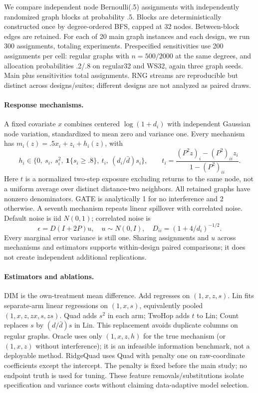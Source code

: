 \documentclass{article}
\newcommand{\one}{\mathbf 1}
\begin{document}
We compare independent node Bernoulli(.5) assignments with independently randomized graph blocks at probability .5. Blocks are deterministically constructed once by degree-ordered BFS, capped at 32 nodes. Between-block edges are retained. For each of 20 main graph instances and each design, we run 300 assignments, totaling \MainAssignments{} experiments. Prespecified sensitivities use 200 assignments per cell: regular graphs with $n=500/2000$ at the same degrees, and allocation probabilities .2/.8 on regular32 and WS32, again three graph seeds. Main plus sensitivities total \AllAssignments{} assignments. RNG streams are reproducible but distinct across designs/suites; different designs are not analyzed as paired draws.

\paragraph{Response mechanisms.}
A fixed covariate $x$ combines centered $\log(1+d_i)$ with independent Gaussian node variation, standardized to mean zero and variance one. Every mechanism has $m_i(z)=.5x_i+z_i+h_i(z)$, with
\begin{equation}\label{eq:mechanisms}
h_i\in\{0,\ s_i,\ s_i^2,\ \one\{s_i\geq.8\},\ t_i,\ (d_i/\bar d)s_i\},\qquad
t_i=\frac{(P^2z)_i-(P^2)_{ii}z_i}{1-(P^2)_{ii}}.
\end{equation}
Here $t$ is a normalized two-step exposure excluding returns to the same node, not a uniform average over distinct distance-two neighbors. All retained graphs have nonzero denominators. GATE is analytically 1 for no interference and 2 otherwise. A seventh mechanism repeats linear spillover with correlated noise. Default noise is iid $N(0,1)$; correlated noise is
\begin{equation}\label{eq:noise}
\epsilon=D(I+2P)u,\quad u\sim N(0,I),\quad D_{ii}=(1+4/d_i)^{-1/2}.
\end{equation}
Every marginal error variance is still one. Sharing assignments and $u$ across mechanisms and estimators supports within-design paired comparisons; it does not create independent additional replications.

\paragraph{Estimators and ablations.}
DIM is the own-treatment mean difference. Add regresses on $(1,x,z,s)$. Lin fits separate-arm linear regressions on $(1,x,s)$, equivalently pooled $(1,x,z,zx,s,zs)$. Quad adds $s^2$ in each arm; TwoHop adds $t$ to Lin; Count replaces $s$ by $(d/\bar d)s$ in Lin. This replacement avoids duplicate columns on regular graphs. Oracle uses only $(1,x,z,h)$ for the true mechanism (or $(1,x,z)$ without interference); it is an infeasible information benchmark, not a deployable method. RidgeQuad uses Quad with penalty one on raw-coordinate coefficients except the intercept. The penalty is fixed before the main study; no endpoint truth is used for tuning. These feature removals/substitutions isolate specification and variance costs without claiming data-adaptive model selection.
\end{document}
